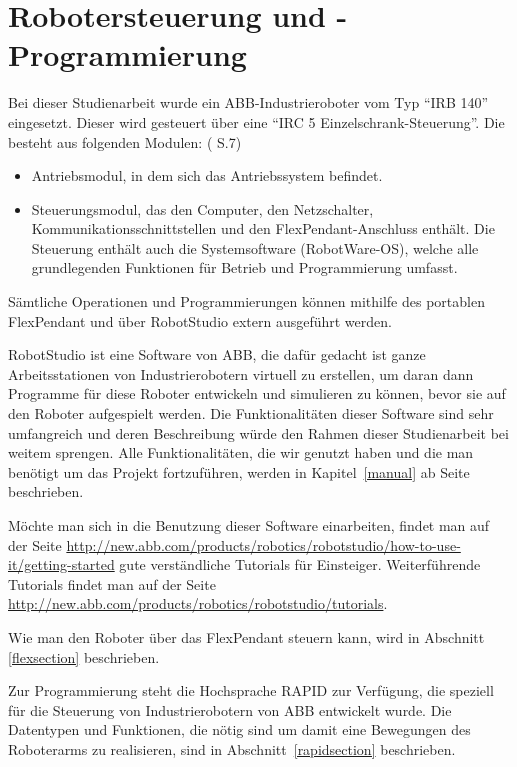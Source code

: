 
\chapter{Robotersteuerung und -Programmierung}
Bei dieser Studienarbeit wurde ein ABB-Industrieroboter vom Typ \enquote{IRB 140} eingesetzt. Dieser wird gesteuert über eine \enquote{IRC 5 Einzelschrank-Steuerung}. Die besteht aus folgenden Modulen: (\cite{irc5} S.7)

\begin{itemize}
\item Antriebsmodul, in dem sich das Antriebssystem befindet.

\item Steuerungsmodul, das den Computer, den Netzschalter, Kommunikationsschnittstellen und den FlexPendant-Anschluss enthält. Die Steuerung enthält auch die Systemsoftware (RobotWare-OS), welche alle grundlegenden Funktionen für Betrieb und Programmierung umfasst.
\end{itemize}

Sämtliche Operationen und Programmierungen können mithilfe des portablen FlexPendant und über RobotStudio extern ausgeführt werden. 

RobotStudio ist eine Software von ABB, die dafür gedacht ist ganze Arbeitsstationen von Industrierobotern virtuell zu erstellen, um daran dann Programme für diese Roboter entwickeln und simulieren zu können, bevor sie auf den Roboter aufgespielt werden. Die Funktionalitäten dieser Software sind sehr umfangreich und deren Beschreibung würde den Rahmen dieser Studienarbeit bei weitem sprengen. Alle Funktionalitäten, die wir genutzt haben und die man benötigt um das Projekt fortzuführen, werden in Kapitel~\ref{manual} ab Seite~\pageref{manual} beschrieben. 

Möchte man sich in die Benutzung dieser Software einarbeiten, findet man auf der Seite \href{http://new.abb.com/products/robotics/robotstudio/how-to-use-it/getting-started}{http://new.abb.com/products/robotics/robotstudio/how-to-use-it/getting-started} gute verständliche Tutorials für Einsteiger. Weiterführende Tutorials findet man auf der Seite \href{http://new.abb.com/products/robotics/robotstudio/tutorials}{http://new.abb.com/products/robotics/robotstudio/tutorials}.

Wie man den Roboter über das FlexPendant steuern kann, wird in Abschnitt \ref{flexsection} beschrieben.

Zur Programmierung steht die Hochsprache RAPID zur Verfügung, die speziell für die Steuerung von Industrierobotern von ABB entwickelt wurde. Die Datentypen und Funktionen, die nötig sind um damit eine Bewegungen des Roboterarms zu realisieren, sind in Abschnitt~\ref{rapidsection} beschrieben.

